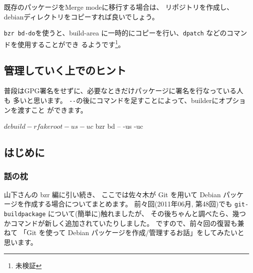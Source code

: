 \documentclass[mingoth,a4paper]{jsarticle}
\begin{document}
既存のパッケージをMerge modeに移行する場合は、
リポジトリを作成し、debianディレクトリをコピーすれば良いでしょう。



\verb|bzr bd-do|を使うと、build-area
に一時的にコピーを行い、\verb|dpatch| などのコマンドを使用することができ
るようです\footnote{未検証}。

\subsection{管理していく上でのヒント}

普段はGPG署名をせずに、必要なときだけパッケージに署名を行なっている人も
多いと思います。
\verb|--|の後にコマンドを足すことによって、builderにオプションを渡すこと
ができます。

\begin{commandline}
 $ debuild -rfakeroot -us -uc
 $ bzr bd -- -us -uc
\end{commandline}
\clearpage



\subsection*{はじめに}
\label{sec-1}
\subsubsection*{話の枕}
\label{sec-1-1}


山下さんの bzr 編に引い続き、
ここでは佐々木が Git を用いて
Debian パッケージを作成する場合についてまとめます。
前々回(2011年06月, 第48回)でも \texttt{git-buildpackage}
について(簡単に)触れましたが、
その後ちゃんと調べたら、幾つかコマンドが新しく追加されていたりしました。
ですので、前々回の復習も兼ねて
「Git を使って Debian パッケージを作成/管理するお話」をしてみたいと思います。
\end{document}
